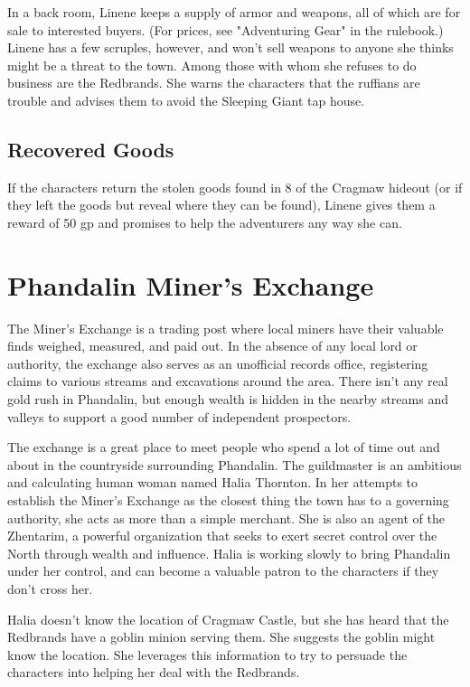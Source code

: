 \documentclass[10pt,a4paper,twoside,bg=print,twocolumn,openany,nodeprecatedcode]{dndbook}
\begin{document}
In a back room, Linene keeps a supply of armor and weapons, all of which are for sale to interested buyers. (For prices, see "Adventuring Gear" in the rulebook.) Linene has a few scruples, however, and won't sell weapons to anyone she thinks might be a threat to the town. Among those with whom she refuses to do business are the Redbrands. She warns the characters that the ruffians are trouble and advises them to avoid the Sleeping Giant tap house.

\subsection{Recovered Goods}
If the characters return the stolen goods found in 8 of the Cragmaw hideout (or if they left the goods but reveal where they can be found), Linene gives them a reward of 50 gp and promises to help the adventurers any way she can.

\section{Phandalin Miner's Exchange}
The Miner's Exchange is a trading post where local miners have their valuable finds weighed, measured, and paid out. In the absence of any local lord or authority, the exchange also serves as an unofficial records office, registering claims to various streams and excavations around the area. There isn't any real gold rush in Phandalin, but enough wealth is hidden in the nearby streams and valleys to support a good number of independent prospectors.

The exchange is a great place to meet people who spend a lot of time out and about in the countryside surrounding Phandalin. The guildmaster is an ambitious and calculating human woman named Halia Thornton. In her attempts to establish the Miner's Exchange as the closest thing the town has to a governing authority, she acts as more than a simple merchant. She is also an agent of the Zhentarim, a powerful organization that seeks to exert secret control over the North through wealth and influence. Halia is working slowly to bring Phandalin under her control, and can become a valuable patron to the characters if they don't cross her.

Halia doesn't know the location of Cragmaw Castle, but she has heard that the Redbrands have a goblin minion serving them. She suggests the goblin might know the location. She leverages this information to try to persuade the characters into helping her deal with the Redbrands.
\end{document}
